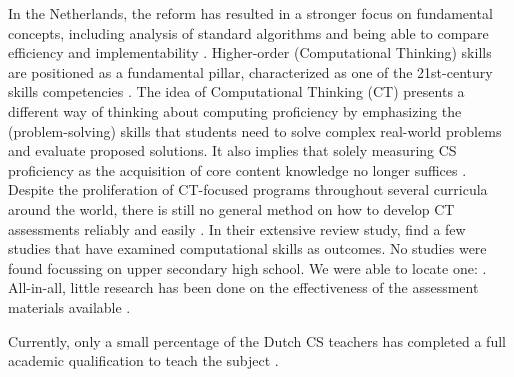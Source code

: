 In the Netherlands, the reform has resulted in a stronger focus on fundamental concepts, including analysis of standard algorithms and being able to compare efficiency and implementability \cite{Barendsen2016}. Higher-order (Computational Thinking) skills are positioned as a fundamental pillar, characterized as one of the 21st-century skills competencies \cite{SLO2015}. The idea of Computational Thinking (CT) presents a different way of thinking about computing proficiency by emphasizing the (problem-solving) skills that students need to solve complex real-world problems and evaluate proposed solutions. It also implies that solely measuring CS proficiency as the acquisition of core content knowledge no longer suffices \cite{Yadav2015}. Despite the proliferation of CT-focused programs throughout several curricula around the world, there is still no general method on how to develop CT assessments reliably and easily \cite{catete2017framework}. In their extensive review study,  find a few studies that have examined computational skills as outcomes. No studies were found focussing on upper secondary high school. We were able to locate one: . All-in-all, little research has been done on the effectiveness of the assessment materials available \cite{Yadav2016}.




Currently, only a small percentage of the Dutch CS teachers has completed a full academic qualification to teach the subject \cite{tolboom2014informatica}.

